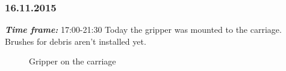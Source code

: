 \subsubsection{16.11.2015}
\textit{\textbf{Time frame:}} 17:00-21:30 \newline
Today the gripper was mounted to the carriage. Brushes for debris aren't installed yet.

\begin{figure}[H]
	\begin{minipage}[h]{1\linewidth}
		\caption{Gripper on the carriage}
	\end{minipage}
\end{figure}

